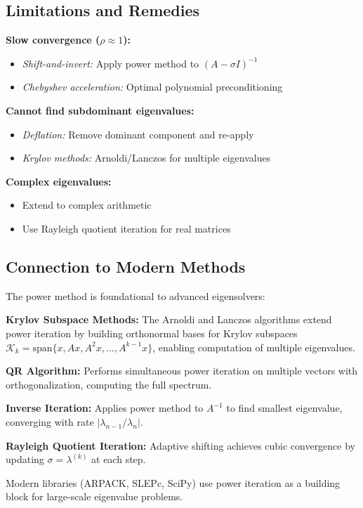 \documentclass[11pt,twocolumn]{article}
\begin{document}
\subsection{Limitations and Remedies}

\textbf{Slow convergence ($\rho \approx 1$):}
\begin{itemize}
\item \emph{Shift-and-invert:} Apply power method to $(A - \sigma I)^{-1}$
\item \emph{Chebyshev acceleration:} Optimal polynomial preconditioning
\end{itemize}

\textbf{Cannot find subdominant eigenvalues:}
\begin{itemize}
\item \emph{Deflation:} Remove dominant component and re-apply
\item \emph{Krylov methods:} Arnoldi/Lanczos for multiple eigenvalues
\end{itemize}

\textbf{Complex eigenvalues:}
\begin{itemize}
\item Extend to complex arithmetic
\item Use Rayleigh quotient iteration for real matrices
\end{itemize}

\subsection{Connection to Modern Methods}

The power method is foundational to advanced eigensolvers:

\textbf{Krylov Subspace Methods:} The Arnoldi and Lanczos algorithms extend power iteration by building orthonormal bases for Krylov subspaces $\mathcal{K}_k = \text{span}\{x, Ax, A^2x, \ldots, A^{k-1}x\}$, enabling computation of multiple eigenvalues.

\textbf{QR Algorithm:} Performs simultaneous power iteration on multiple vectors with orthogonalization, computing the full spectrum.

\textbf{Inverse Iteration:} Applies power method to $A^{-1}$ to find smallest eigenvalue, converging with rate $|\lambda_{n-1}/\lambda_n|$.

\textbf{Rayleigh Quotient Iteration:} Adaptive shifting achieves cubic convergence by updating $\sigma = \lambda^{(k)}$ at each step.

Modern libraries (ARPACK, SLEPc, SciPy) use power iteration as a building block for large-scale eigenvalue problems.
\end{document}
